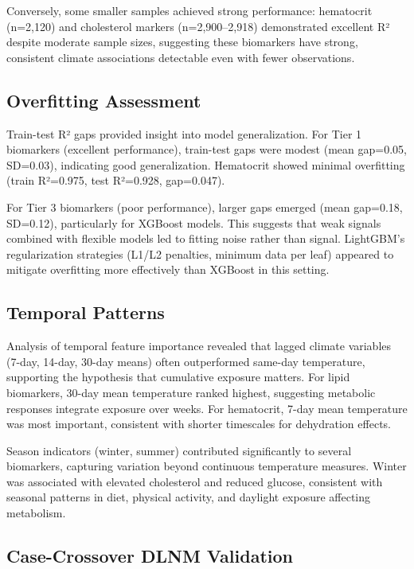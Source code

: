 Conversely, some smaller samples achieved strong performance: hematocrit (n=2,120) and cholesterol markers (n=2,900--2,918) demonstrated excellent R² despite moderate sample sizes, suggesting these biomarkers have strong, consistent climate associations detectable even with fewer observations.

\subsection{Overfitting Assessment}

Train-test R² gaps provided insight into model generalization. For Tier 1 biomarkers (excellent performance), train-test gaps were modest (mean gap=0.05, SD=0.03), indicating good generalization. Hematocrit showed minimal overfitting (train R²=0.975, test R²=0.928, gap=0.047).

For Tier 3 biomarkers (poor performance), larger gaps emerged (mean gap=0.18, SD=0.12), particularly for XGBoost models. This suggests that weak signals combined with flexible models led to fitting noise rather than signal. LightGBM's regularization strategies (L1/L2 penalties, minimum data per leaf) appeared to mitigate overfitting more effectively than XGBoost in this setting.

\subsection{Temporal Patterns}

Analysis of temporal feature importance revealed that lagged climate variables (7-day, 14-day, 30-day means) often outperformed same-day temperature, supporting the hypothesis that cumulative exposure matters. For lipid biomarkers, 30-day mean temperature ranked highest, suggesting metabolic responses integrate exposure over weeks. For hematocrit, 7-day mean temperature was most important, consistent with shorter timescales for dehydration effects.

Season indicators (winter, summer) contributed significantly to several biomarkers, capturing variation beyond continuous temperature measures. Winter was associated with elevated cholesterol and reduced glucose, consistent with seasonal patterns in diet, physical activity, and daylight exposure affecting metabolism.

\subsection{Case-Crossover DLNM Validation}

